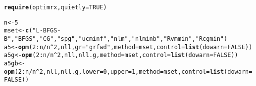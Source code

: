 \documentclass[11pt]{article}\usepackage[]{graphicx}\usepackage[]{color}
\makeatletter
\newcommand{\hlnum}[1]{\textcolor[rgb]{0.686,0.059,0.569}{#1}}%
\newcommand{\hlstr}[1]{\textcolor[rgb]{0.192,0.494,0.8}{#1}}%
\newcommand{\hlopt}[1]{\textcolor[rgb]{0,0,0}{#1}}%
\newcommand{\hlstd}[1]{\textcolor[rgb]{0.345,0.345,0.345}{#1}}%
\newcommand{\hlkwb}[1]{\textcolor[rgb]{0.69,0.353,0.396}{#1}}%
\newcommand{\hlkwc}[1]{\textcolor[rgb]{0.333,0.667,0.333}{#1}}%
\newcommand{\hlkwd}[1]{\textcolor[rgb]{0.737,0.353,0.396}{\textbf{#1}}}%
\newenvironment{kframe}{%
 \def\at@end@of@kframe{}%
 \ifinner\ifhmode%
  \def\at@end@of@kframe{\end{minipage}}%
  \begin{minipage}{\columnwidth}%
 \fi\fi%
 \def\FrameCommand##1{\hskip\@totalleftmargin \hskip-\fboxsep
 \colorbox{shadecolor}{##1}\hskip-\fboxsep
     \hskip-\linewidth \hskip-\@totalleftmargin \hskip\columnwidth}%
 \MakeFramed {\advance\hsize-\width
   \@totalleftmargin\z@ \linewidth\hsize
   \@setminipage}}%
 {\par\unskip\endMakeFramed%
 \at@end@of@kframe}
\newenvironment{knitrout}{}{} %
\makeatother
\begin{document}
\begin{knitrout}\scriptsize
{}\color{fgcolor}\begin{kframe}
\begin{alltt}
\hlkwd{require}\hlstd{(optimrx,} \hlkwc{quietly}\hlstd{=}\hlnum{TRUE}\hlstd{)}
\end{alltt}


{\ttfamily\noindent\itshape\color{messagecolor}{\#\# \\\#\# Attaching package: 'optimrx'}}

{\ttfamily\noindent\itshape\color{messagecolor}{\#\# The following object is masked from 'package:optimx':\\\#\# \\\#\#\ \ \ \  coef<-}}\begin{alltt}
\hlstd{n}\hlkwb{<-}\hlnum{5}
\hlstd{mset}\hlkwb{<-}\hlkwd{c}\hlstd{(}\hlstr{"L-BFGS-B"}\hlstd{,} \hlstr{"BFGS"}\hlstd{,} \hlstr{"CG"}\hlstd{,} \hlstr{"spg"}\hlstd{,} \hlstr{"ucminf"}\hlstd{,} \hlstr{"nlm"}\hlstd{,} \hlstr{"nlminb"}\hlstd{,} \hlstr{"Rvmmin"}\hlstd{,} \hlstr{"Rcgmin"}\hlstd{)}
\hlstd{a5}\hlkwb{<-}\hlkwd{opm}\hlstd{(}\hlnum{2}\hlopt{:}\hlstd{n}\hlopt{/}\hlstd{n}\hlopt{^}\hlnum{2}\hlstd{, nll,} \hlkwc{gr}\hlstd{=}\hlstr{"grfwd"}\hlstd{,} \hlkwc{method}\hlstd{=mset,} \hlkwc{control}\hlstd{=}\hlkwd{list}\hlstd{(}\hlkwc{dowarn}\hlstd{=}\hlnum{FALSE}\hlstd{))}
\hlstd{a5g}\hlkwb{<-}\hlkwd{opm}\hlstd{(}\hlnum{2}\hlopt{:}\hlstd{n}\hlopt{/}\hlstd{n}\hlopt{^}\hlnum{2}\hlstd{, nll, nll.g,} \hlkwc{method}\hlstd{=mset,} \hlkwc{control}\hlstd{=}\hlkwd{list}\hlstd{(}\hlkwc{dowarn}\hlstd{=}\hlnum{FALSE}\hlstd{))}
\hlstd{a5gb}\hlkwb{<-}\hlkwd{opm}\hlstd{(}\hlnum{2}\hlopt{:}\hlstd{n}\hlopt{/}\hlstd{n}\hlopt{^}\hlnum{2}\hlstd{, nll, nll.g,} \hlkwc{lower}\hlstd{=}\hlnum{0}\hlstd{,} \hlkwc{upper}\hlstd{=}\hlnum{1}\hlstd{,} \hlkwc{method}\hlstd{=mset,} \hlkwc{control}\hlstd{=}\hlkwd{list}\hlstd{(}\hlkwc{dowarn}\hlstd{=}\hlnum{FALSE}\hlstd{))}
\end{alltt}


{\ttfamily\noindent\color{warningcolor}{\#\# Warning in optimr(par, fn, gr, method = meth, lower = lower, upper = upper, : optimr: optim() with bounds ONLY uses L-BFGS-B}}


\end{kframe}
\end{knitrout}
\end{document}
